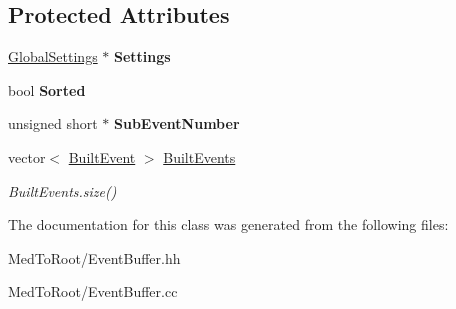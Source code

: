 \subsection*{Protected Attributes}
\begin{DoxyCompactItemize}
\item 
\hypertarget{class_event_buffer_a0c7ee1b008d8ff909977d6c38c010923}{\hyperlink{class_global_settings}{Global\-Settings} $\ast$ {\bfseries Settings}}\label{class_event_buffer_a0c7ee1b008d8ff909977d6c38c010923}

\item 
\hypertarget{class_event_buffer_ad495f17af4b84135789a21ed0109a239}{bool {\bfseries Sorted}}\label{class_event_buffer_ad495f17af4b84135789a21ed0109a239}

\item 
\hypertarget{class_event_buffer_a0427cf345d5e88932b754966c21535e1}{unsigned short $\ast$ {\bfseries Sub\-Event\-Number}}\label{class_event_buffer_a0427cf345d5e88932b754966c21535e1}

\item 
\hypertarget{class_event_buffer_a18101f4a449fbf92fa3c946b0924fb10}{vector$<$ \hyperlink{class_built_event}{Built\-Event} $>$ \hyperlink{class_event_buffer_a18101f4a449fbf92fa3c946b0924fb10}{Built\-Events}}\label{class_event_buffer_a18101f4a449fbf92fa3c946b0924fb10}

\begin{DoxyCompactList}\small\item\em Built\-Events.\-size() \end{DoxyCompactList}\end{DoxyCompactItemize}


The documentation for this class was generated from the following files\-:\begin{DoxyCompactItemize}
\item 
Med\-To\-Root/Event\-Buffer.\-hh\item 
Med\-To\-Root/Event\-Buffer.\-cc\end{DoxyCompactItemize}
